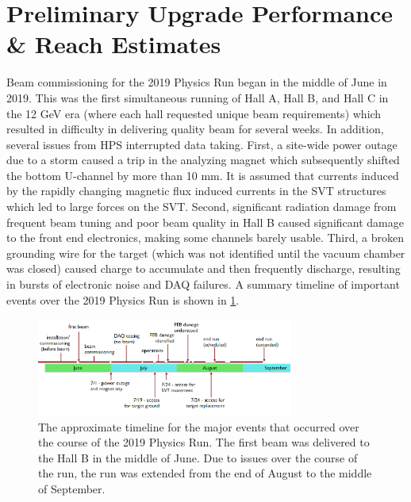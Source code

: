 \clearpage


\section{Preliminary Upgrade Performance \& Reach Estimates}\label{sec:2019data}

Beam commissioning for the 2019 Physics Run began in the middle of June in 2019. This was the first simultaneous running of Hall A, Hall B, and Hall C in the 12 GeV era (where each hall requested unique beam requirements) which resulted in difficulty in delivering quality beam for several weeks. In addition, several issues from HPS interrupted data taking. First, a site-wide power outage due to a storm caused a trip in the analyzing magnet which subsequently shifted the bottom U-channel by more than 10 mm. It is assumed that currents induced by the rapidly changing magnetic flux induced currents in the SVT structures which led to large forces on the SVT. Second, significant radiation damage from frequent beam tuning  and poor beam quality in Hall B caused significant damage to the front end electronics, making some channels barely usable. Third, a broken grounding wire for the target (which was not identified until the vacuum chamber was closed) caused charge to accumulate and then frequently discharge, resulting in bursts of electronic noise and DAQ failures. A summary timeline of important events over the 2019 Physics Run is shown in \ref{fig:2019timeline}.

\begin{figure}
    \centering
    \includegraphics[width=0.75\textwidth]{figs/upgrades/2019_timeline.png}
    \caption{The approximate timeline for the major events that occurred over the course of the 2019 Physics Run. The first beam was delivered to the Hall B in the middle of June. Due to issues over the course of the run, the run was extended from the end of August to the middle of September.}
    \label{fig:2019timeline}
\end{figure}

